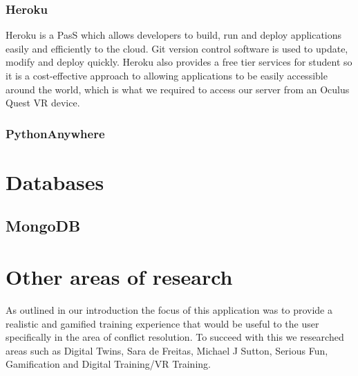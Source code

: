 \subsubsection{Heroku}
Heroku is a PasS which allows developers to build, run and deploy applications easily and efficiently to the cloud. Git version control software is used to update, modify and deploy quickly. Heroku also provides a free tier services for student so it is a cost-effective approach to allowing applications to be easily accessible around the world, which is what we required to access our server from an Oculus Quest VR device. 

\subsubsection{PythonAnywhere}

\section{Databases}
\subsection{MongoDB}

\section{Other areas of research}
As outlined in our introduction the focus of this application was to provide a realistic and gamified training experience that would be useful to the user specifically in the area of conflict resolution. To succeed with this we researched areas such as Digital Twins, Sara de Freitas, Michael J Sutton, Serious Fun, Gamification and Digital Training/VR Training.